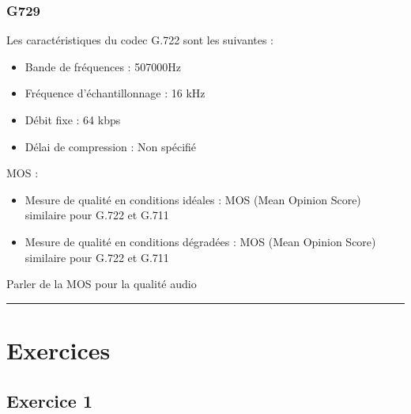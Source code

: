 \documentclass[letterpaper,10pt,french]{sphinxmanual}
\begin{document}
\sphinxAtStartPar


\noindent{}

\sphinxAtStartPar



\subsubsection{G729}
\label{\detokenize{Documentation-M362:g729}}
\noindent{}

\sphinxAtStartPar
Les caractéristiques du codec G.722 sont les suivantes :
\begin{itemize}
\item {} 
\sphinxAtStartPar
Bande de fréquences : 50\sphinxhyphen{}7000Hz

\item {} 
\sphinxAtStartPar
Fréquence d’échantillonnage : 16 kHz

\item {} 
\sphinxAtStartPar
Débit fixe : 64 kbps

\item {} 
\sphinxAtStartPar
Délai de compression : Non spécifié

\end{itemize}

\sphinxAtStartPar
MOS :
\begin{itemize}
\item {} 
\sphinxAtStartPar
Mesure de qualité en conditions idéales : MOS (Mean Opinion Score) similaire pour G.722 et G.711

\item {} 
\sphinxAtStartPar
Mesure de qualité en conditions dégradées : MOS (Mean Opinion Score) similaire pour G.722 et G.711

\end{itemize}

\sphinxAtStartPar
Parler de la MOS pour la qualité audio


\bigskip\hrule\bigskip



\section{Exercices}
\label{\detokenize{Documentation-M362:exercices}}

\subsection{Exercice 1}
\label{\detokenize{Documentation-M362:exercice-1}}
\end{document}
